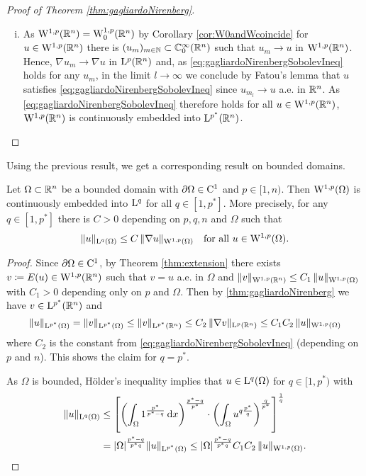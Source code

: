 \begin{proof}[Proof of Theorem \ref{thm:gagliardoNirenberg}]
\begin{enumerate}[i)]
    \item As $\mathrm{W}^{1,p}(\mathbb{R}^n) = \mathrm{W}_0^{1,p}(\mathbb{R}^n)$ by Corollary \ref{cor:W0andWcoincide} for $u \in \mathrm{W}^{1,p}(\mathbb{R}^n)$ there is $(u_m)_{m \in \mathbb{N}} \subset \mathbb{C}_0^\infty(\mathbb{R}^n)$ such that $u_m \to u$ in $\mathrm{W}^{1,p}(\mathbb{R}^n)$.
      Hence, $\nabla u_m \to \nabla u$ in $\mathrm{L}^p(\mathbb{R}^n)$ and, as \eqref{eq:gagliardoNirenbergSobolevIneq} holds for any $u_m$, in the limit $l \to \infty$ we conclude by Fatou's lemma that $u$ satisfies \eqref{eq:gagliardoNirenbergSobolevIneq} since $u_{m_l} \to u$ a.e. in $\mathbb{R}^n$.
      As \eqref{eq:gagliardoNirenbergSobolevIneq} therefore holds for all $u \in \mathrm{W}^{1,p}(\mathbb{R}^n)$, $\mathrm{W}^{1,p}(\mathbb{R}^n)$ is continuously embedded into $\mathrm{L}^{p^*}(\mathbb{R}^n)$. \qedhere
  \end{enumerate}
\end{proof}

Using the previous result, we get a corresponding result on bounded domains.

\begin{thm}
  Let $\Omega \subset \mathbb{R}^n$ be a bounded domain with $\partial\Omega \in \mathrm{C}^1$ and $p \in [1,n)$.
    Then $\mathrm{W}^{1,p}(\Omega)$ is continuously embedded into $\mathrm{L}^q$ for all $q \in [1,p^*]$.
    More precisely, for any $q \in [1,p^*]$ there is $C > 0$ depending on $p,q,n$ and $\Omega$ such that
    \begin{equation}
      \|u\|_{\mathrm{L}^q(\Omega)} \leq C \, \|\nabla u\|_{\mathrm{W}^{1,p}(\Omega)} \quad\text{for all } u \in \mathrm{W}^{1,p}(\Omega).
    \end{equation}
\end{thm}

\begin{proof}
  Since $\partial \Omega \in \mathrm{C}^1$, by Theorem \ref{thm:extension} there exists $v \coloneqq E(u) \in \mathrm{W}^{1,p}(\mathbb{R}^n)$ such that $v = u$ a.e. in $\Omega$ and $\|v\|_{\mathrm{W}^{1,p}(\mathbb{R}^n)} \leq C_1 \, \|u\|_{\mathrm{W}^{1,p}(\Omega)}$ with $C_1 > 0$ depending only on $p$ and $\Omega$.
  Then by \ref{thm:gagliardoNirenberg} we have $v \in \mathrm{L}^{p^*}(\mathbb{R}^n)$ and
  $$
  \| u\|_{\mathrm{L}^{p^*}(\Omega)} = \|v\|_{\mathrm{L}^{p^*}(\Omega)} \leq \|v\|_{\mathrm{L}^{p^*}(\mathbb{R}^n)} \leq C_2 \, \|\nabla v\|_{\mathrm{L}^p(\mathbb{R}^n)} \leq C_1 C_2 \, \|u\|_{\mathrm{W}^{1,p}(\Omega)}
  $$
  where $C_2$ is the constant from \eqref{eq:gagliardoNirenbergSobolevIneq} (depending on $p$ and $n$).
  This shows the claim for $q = p^*$.

  As $\Omega$ is bounded, Hölder's inequality implies that $u \in \mathrm{L}^q(\Omega)$ for $q \in [1,p^*)$ with
  \begin{align}
    \label{eq:embeddingpltn}
    \|u\|_{\mathrm{L}^q(\Omega)}
    & \leq \left[ \left( \int_\Omega 1^{\frac{p^*}{p^* - q}} \, {\operatorname{d}\!{x}} \right)^{\frac{p^* - q}{p^*}} \cdot \left( \int_\Omega u^{q  \frac{p^*}{q}} \right)^{\frac{q}{p^*}} \right]^{\frac{1}{q}} \\
    &= |\Omega|^{\frac{p^* - q}{p^* q}} \|u\|_{\mathrm{L}^{p^*}(\Omega)}
    \leq |\Omega|^{\frac{p^* - q}{p^* q}} C_1 C_2 \, \|u\|_{\mathrm{W}^{1,p}(\Omega)} \nonumber. \qedhere
  \end{align}
\end{proof}

